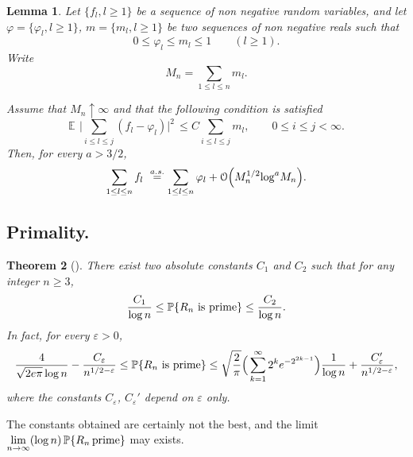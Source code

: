 \documentclass[11pt,draft,reqno]{amsart}
\newtheorem{theorem}{Theorem}[section]
\newtheorem{lemma}[theorem]{Lemma}
\theoremstyle{definition}
\theoremstyle{remarks}
\numberwithin{equation}{section}
\def \e{{\varepsilon}}
\def \p{{\varphi}}
\def \noi{{\noindent}}
\def\P{{\mathcal P}}
\def\E{{\mathbb E \,}}
\def\P{{\mathbb P}}
\begin{document}
\begin{lemma} \label{NkRnl4} 
Let $ \{f_l, l\ge 1\}$ be a sequence
 of non negative random variables, and let $\p=\{\p_l, l\ge 1\}$, $m=\{m_l, l\ge 1\}$ be two sequences of
non negative reals such that 
\begin{equation}\label{RNRM.2.49}
 0\le \p_l\le m_l \le 1\qquad (l\ge 1).
\end{equation}
Write 
$$ M_n =\sum_{1\le l\le n}  m_l.$$

\noi  Assume that $M_n\uparrow\infty$ and that the following condition is satisfied 
\begin{equation}\label{RNRM.2.50}\E\  \big| \sum_{i\le l \le j}(f_l-\p_l)\big|^2 \,\le
C\sum_{i\le l \le j} m_l ,
\qquad  0\le i\le
 j<\infty. 
 \end{equation}
    Then, for every $a>3/2$,   
\begin{equation}\label{RNRM.2.51} \sum_{1\le l\le n}  f_l \ \buildrel{a.s.}\over{=} \sum_{1\le l\le n}  \p_l +{\mathcal O}\Bigl( M_n^{1/2}  {\log}^{ a}
M_n \Big). 
\end{equation}
 \end{lemma}
\subsection{Primality.}

 
\begin{theorem}[\cite{W5a}]\label{P-Rn} There exist two absolute constants $C_1$ and  $C_2$ such that for any integer $n\ge 3$,
$$ {  C_1  \over    \log
n }\le \P\{R_n\ \hbox{is prime} \}\le { C_2  \over    \log
n }. $$   
In fact, for every $\e>0$,
$${4    \over  \sqrt{ 2e\pi  }\log n}-{C _\e  \over  n^{  
    1/2-\e }}\le \P\{R_n\ \hbox{is prime} \}\le   \sqrt{{2
\over     \pi }  }\Big(\sum_{k=1}^{\infty}
{2^{ k }    }e^{-   2^{2k-1  } }\Big)  {1
\over \log     n  }+{C'_\e  \over  n^{  
    1/2-\e }},$$
where the constants $C_\e$, $C_\e '$ depend on $\e$ only.\end{theorem}
The constants obtained are certainly not the best, and the  limit  $\displaystyle{\lim_{n\to \infty}} (\log n)\,\P\{R_n\, \hbox{prime} \}$ may  exists.
\end{document}
